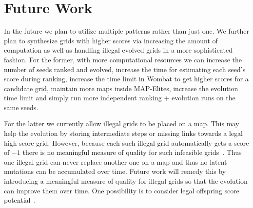 \section{Future Work}

In the future we plan to utilize multiple patterns rather than just one.
We further plan to synthesize grids with higher scores via increasing the amount of computation as well as handling illegal evolved grids in a more sophisticated fashion. For the former, with more computational resources we can increase the number of seeds ranked and evolved, increase the time for estimating each seed's score during ranking, increase the time limit in {\sc Wombat} to get higher scores for a candidate grid, maintain more maps inside MAP-Elites, increase the evolution time limit and simply run more independent ranking + evolution runs on the same seeds. 

For the latter we currently allow illegal grids to be placed on a map. This may help the evolution by storing intermediate steps or missing links towards a legal high-score grid. However, because each such illegal grid automatically gets a score of $-1$ there is no meaningful measure of quality for such infeasible grids~\cite{FI2Pop}. Thus one illegal grid can never replace another one on a map and thus no latent mutations can be accumulated over time. Future work will remedy this by introducing a meaningful measure of quality for illegal grids so that the evolution can improve them over time. One possibility is to consider legal offspring score potential~\cite{Gallotta_2022}.